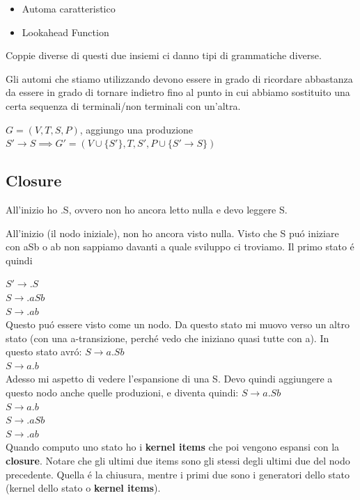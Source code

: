 \begin{itemize}
    \item Automa caratteristico \\
    \item Lookahead Function \\
\end{itemize}

Coppie diverse di questi due insiemi ci danno tipi di grammatiche diverse.

Gli automi che stiamo utilizzando devono essere in grado di ricordare abbastanza da essere in grado di tornare indietro fino al punto 
in cui abbiamo sostituito una certa sequenza di terminali/non terminali con un'altra.

$G = (V,T,S,P)$, aggiungo una produzione $S' \rightarrow S \implies G' = (V \cup \{S'\},T,S',P \cup \{S' \rightarrow S\})$\\
\subsection{Closure}

All'inizio ho .S, ovvero non ho ancora letto nulla e devo leggere S.

All'inizio (il nodo iniziale), non ho ancora visto nulla. Visto che S pu\'o iniziare con aSb o ab non sappiamo davanti a quale sviluppo ci troviamo. Il primo stato \'e quindi 

$S' \rightarrow .S$\\
$S \rightarrow .aSb$\\
$S \rightarrow .ab$\\

Questo pu\'o essere visto come un nodo. Da questo stato mi muovo verso un altro stato (con una a-transizione, perch\'e vedo che iniziano 
quasi tutte con a). In questo stato avr\'o:
$S \rightarrow a.Sb$\\
$S \rightarrow a.b$\\

Adesso mi aspetto di vedere l'espansione di una S. Devo quindi aggiungere a questo nodo anche quelle produzioni, e diventa quindi:
$S \rightarrow a.Sb$\\
$S \rightarrow a.b$\\
$S \rightarrow .aSb$\\
$S \rightarrow .ab$\\

Quando computo uno stato ho i \textbf{kernel items} che poi vengono espansi con la \textbf{closure}.
Notare che gli ultimi due items sono gli stessi degli ultimi due del nodo precedente. 
Quella \'e la chiusura, mentre i primi due sono i generatori dello stato (kernel dello stato o \textbf{kernel items}).

